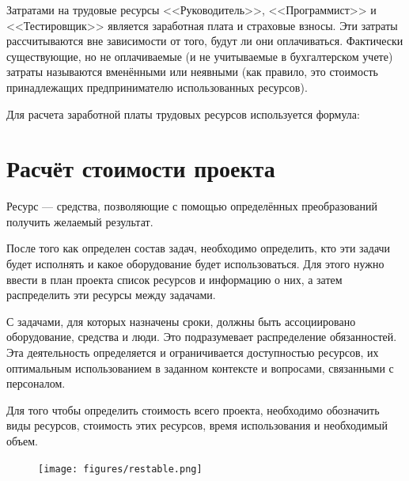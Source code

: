 Затратами на трудовые ресурсы <<Руководитель>>, <<Программист>> и <<Тестировщик>> является заработная плата и страховые взносы. Эти затраты рассчитываются вне зависимости от того, будут ли они оплачиваться. Фактически существующие, но не оплачиваемые (и не учитываемые в бухгалтерском учете) затраты называются вменёнными или неявными (как правило, это стоимость принадлежащих предпринимателю использованных ресурсов).

Для расчета заработной платы трудовых ресурсов используется формула:



\section{Расчёт стоимости проекта}

Ресурс — средства, позволяющие с помощью определённых преобразований получить желаемый результат. 

После того как определен состав задач, необходимо определить, кто эти задачи будет исполнять и какое оборудование будет использоваться. Для этого нужно ввести в план проекта список ресурсов и информацию о них, а затем распределить эти ресурсы между задачами. 

С задачами, для которых назначены сроки, должны быть ассоциировано оборудование, средства и люди. Это подразумевает распределение обязанностей. Эта деятельность определяется и ограничивается доступностью ресурсов, их оптимальным использованием в заданном контексте и вопросами, связанными с персоналом.  

Для того чтобы определить стоимость всего проекта, необходимо обозначить виды ресурсов, стоимость этих ресурсов, время использования и необходимый объем.

\begin{figure}[H]
	\centering
	\texttt{[image: figures/restable.png]}
	\label{fig:restable}
\end{figure} 

